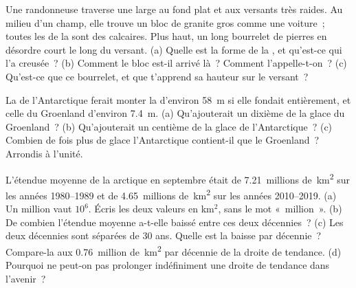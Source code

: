 \begin{exercise}[$\star\star$]\label{exo:g8:ice-on-earth:9}
Une randonneuse traverse une large  au fond plat et aux versants très
raides. Au milieu d'un champ, elle trouve un bloc de granite gros comme une
voiture~; toutes les  de la  sont des calcaires. Plus haut, un
long bourrelet de pierres en désordre court le long du versant. (a) Quelle
est la forme de la , et qu'est-ce qui l'a creusée~? (b) Comment le
bloc est-il arrivé là~? Comment l'appelle-t-on~? (c) Qu'est-ce que ce
bourrelet, et que t'apprend sa hauteur sur le versant~?
\end{exercise}

\begin{exercise}[$\star\star$]\label{exo:g8:ice-on-earth:10}
La  de l'Antarctique ferait monter la  d'environ
\qty{58}{m} si elle fondait entièrement, et celle du Groenland d'environ
\qty{7.4}{m}. (a) Qu'ajouterait un dixième de la glace du Groenland~?
(b) Qu'ajouterait un centième de la glace de l'Antarctique~? (c) Combien
de fois plus de glace l'Antarctique contient-il que le Groenland~? Arrondis
à l'unité.
\end{exercise}

\begin{exercise}[$\star\star\star$]\label{exo:g8:ice-on-earth:11}
L'étendue moyenne de la  arctique en septembre était de
\num{7.21}~millions de~\unit{km^2} sur les années 1980--1989 et de
\num{4.65}~millions de~\unit{km^2} sur les années 2010--2019. (a) Un
million vaut $10^6$. Écris les deux valeurs en km$^2$, sans le mot
«~million~». (b) De combien l'étendue moyenne a-t-elle baissé entre ces
deux décennies~? (c) Les deux décennies sont séparées de 30 ans. Quelle
est la baisse par décennie~? Compare-la aux \num{0.76}~million
de~\unit{km^2} par décennie de la droite de tendance. (d) Pourquoi ne
peut-on pas prolonger indéfiniment une droite de tendance dans l'avenir~?
\end{exercise}

